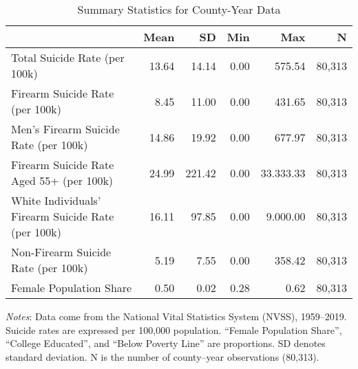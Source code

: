 \begin{table}
\centering
\caption{Summary Statistics for County-Year Data}\label{tab01:sum}
\centering
\begin{tabular}[t]{lrrrrr}
\toprule
  & Mean & SD & Min & Max & N\\
\midrule
Total Suicide Rate (per 100k) & \num{13.64} & \num{14.14} & \num{0.00} & \num{575.54} & 80,313\\
Firearm Suicide Rate (per 100k) & \num{8.45} & \num{11.00} & \num{0.00} & \num{431.65} & 80,313\\
Men's Firearm Suicide Rate (per 100k) & \num{14.86} & \num{19.92} & \num{0.00} & \num{677.97} & 80,313\\
Firearm Suicide Rate Aged 55+ (per 100k) & \num{24.99} & \num{221.42} & \num{0.00} & \num{33,333.33} & 80,313\\
White Individuals' Firearm Suicide Rate (per 100k) & \num{16.11} & \num{97.85} & \num{0.00} & \num{9,000.00} & 80,313\\
Non-Firearm Suicide Rate (per 100k) & \num{5.19} & \num{7.55} & \num{0.00} & \num{358.42} & 80,313\\
Female Population Share & \num{0.50} & \num{0.02} & \num{0.28} & \num{0.62} & 80,313\\
\bottomrule
\end{tabular}
\vspace{0.2em}
\begin{minipage}{0.95\linewidth}
\footnotesize\emph{Notes}: Data come from the National Vital Statistics System (NVSS), 1959--2019. Suicide rates are expressed per 100{,}000 population. ``Female Population Share'', ``College Educated'', and ``Below Poverty Line'' are proportions. SD denotes standard deviation. N is the number of county--year observations (80{,}313).
\end{minipage}
\end{table}
